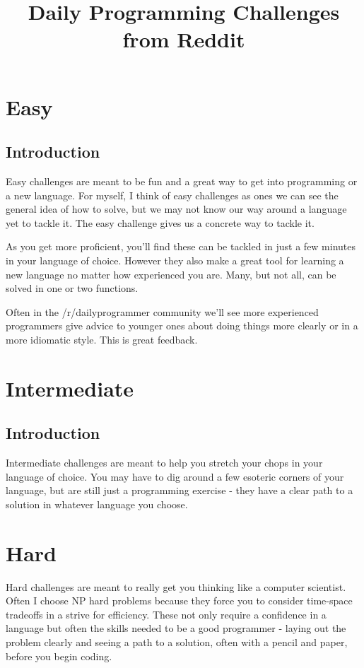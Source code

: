 \documentclass{book}
\title{Daily Programming Challenges from Reddit}
\begin{document}
    
\maketitle

\tableofcontents

\chapter{Easy}

\section*{Introduction}

Easy challenges are meant to be fun and a great way to get into programming or a new language. For myself, I think of easy challenges as ones we can see the general idea of how to solve, but we may not know our way around a language yet to tackle it. The easy challenge gives us a concrete way to tackle it. 

As you get more proficient, you'll find these can be tackled in just a few minutes in your language of choice. However they also make a great tool for learning a new language no matter how experienced you are. Many, but not all, can be solved in one or two functions. 

Often in the /r/dailyprogrammer community we'll see more experienced programmers give advice to younger ones about doing things more clearly or in a more idiomatic style. This is great feedback.



\chapter{Intermediate}

\section*{Introduction}

Intermediate challenges are meant to help you stretch your chops in your language of choice. You may have to dig around a few esoteric corners of your language, but are still just a programming exercise - they have a clear path to a solution in whatever language you choose. 



\chapter{Hard}

Hard challenges are meant to really get you thinking like a computer scientist. Often I choose NP hard problems because they force you to consider time-space tradeoffs in a strive for efficiency. These not only require a confidence in a language but often the skills needed to be a good programmer - laying out the problem clearly and seeing a path to a solution, often with a pencil and paper, before you begin coding. 


\end{document}
